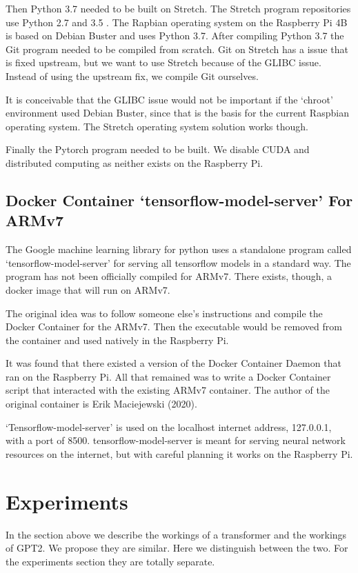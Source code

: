 Then Python 3.7 needed to be built on Stretch. The Stretch program repositories use Python 2.7 and 3.5 . The Rapbian operating system on the Raspberry Pi 4B is based on Debian Buster and uses Python 3.7. After compiling Python 3.7 the Git program needed to be compiled from scratch. Git on Stretch has a issue that is fixed upstream, but we want to use Stretch because of the GLIBC issue. Instead of using the upstream fix, we compile Git ourselves.

It is conceivable that the GLIBC issue would not be important if the `chroot' environment used Debian Buster, since that is the basis for the current Raspbian operating system. The Stretch operating system solution works though.

Finally the Pytorch program needed to be built. We disable CUDA and distributed computing as neither exists on the Raspberry Pi.

\subsection*{Docker Container `tensorflow-model-server' For ARMv7}
The Google machine learning library for python uses a standalone program called `tensorflow-model-server' for serving all tensorflow models in a standard way. The program has not been officially compiled for ARMv7. There exists, though, a docker image that will run on ARMv7.

The original idea was to follow someone else's instructions and compile the Docker Container for the ARMv7. Then the executable would be removed from the container and used natively in the Raspberry Pi.

It was found that there existed a version of the Docker Container Daemon that ran on the Raspberry Pi. All that remained was to write a Docker Container script that interacted with the existing ARMv7 container. The author of the original container is Erik Maciejewski (2020)\cite{2020Maciejewski}.

`Tensorflow-model-server' is used on the localhost internet address, 127.0.0.1, with a port of 8500. tensorflow-model-server is meant for serving neural network resources on the internet, but with careful planning it works on the Raspberry Pi.

\section{Experiments}
In the section above we describe the workings of a transformer and the workings of GPT2. We propose they are similar. Here we distinguish between the two. For the experiments section they are totally separate.

